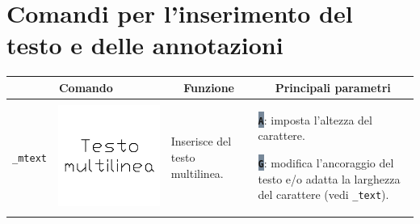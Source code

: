 \documentclass[..]{../IEEEphot}
\newcommand{\param}[1]{\colorbox{LightSlateGray}{\color{Navy}\texttt{\textbf{#1}}}}
\begin{document}
\clearpage

\section{Comandi per l'inserimento del testo e delle annotazioni}

\begin{center}
\begin{longtable}{m{.2\linewidth}m{.2\linewidth}m{.25\linewidth}m{.25\linewidth}}
\toprule
    \multicolumn{2}{c}{\bfseries Comando} &
    \multicolumn{1}{c}{\bfseries Funzione} &
    \multicolumn{1}{c}{\bfseries Principali parametri} \\
\midrule
\texttt{\_mtext} & \includegraphics[width = 0.8\linewidth, keepaspectratio]{../images/jpg/_mtext.jpg} & Inserisce del testo multilinea. & 
\param{A}: imposta l'altezza del carattere.

\param{G}: modifica l'ancoraggio del testo e/o adatta la larghezza del carattere (vedi \texttt{\_text}).


\end{longtable}
\end{center}
\end{document}
